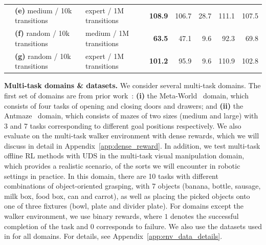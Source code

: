 \begin{table}[ht]
\begin{center}
{\begin{tabular}{l|l|l|rrr|rr}
& \textbf{(e)} medium / 10k transitions & expert / 1M transitions & \textbf{108.9}   & 106.7 & 28.7 & 111.1 & 107.5\\
& \textbf{(f)} random / 10k transitions & medium / 1M transitions & \textbf{63.5}  & 47.1 & 9.6 & 92.3 & 69.8\\
& \textbf{(g)} random / 10k transitions & expert / 1M transitions  & \textbf{101.2} & 95.9 & 9.6 & 110.9 & 102.8\\
\bottomrule
\end{tabular}}
\end{center}
\vspace{-0.7cm}
\label{tbl:single_task_analysis}
\normalsize
\end{table}

\noindent \textbf{Multi-task domains \& datasets.} We consider several multi-task domains. The first set of domains are from prior work~\citep{yu2021conservative}: \textbf{(i)} the Meta-World~\citep{yu2020meta} domain, which consists of four tasks of opening and closing doors and drawers; and \textbf{(ii)} the Antmaze~\citep{fu2020d4rl} domain, which consists of mazes of two sizes (medium and large) with 3 and 7 tasks corresponding to different goal positions respectively. We also evaluate on the multi-task walker environment with dense rewards, which we will discuss in detail in Appendix~\ref{app:dense_reward}.
In addition, we test multi-task offline RL methods with UDS in the multi-task visual manipulation domain, which provides a realistic scenario, of the sorts we will encounter in robotic settings in practice. In this domain, there are 10 tasks with different combinations of object-oriented grasping, with 7 objects (banana, bottle, sausage, milk box, food box, can and carrot), as well as placing the picked objects onto one of three fixtures (bowl, plate and divider plate). For domains except the walker environment, we use binary rewards, where $1$ denotes the successful completion of the task and $0$ corresponds to failure. We also use the datasets used in \cite{yu2021conservative} for all domains. For details, see Appendix~\ref{app:env_data_details}.


\vspace{-0.1cm}
